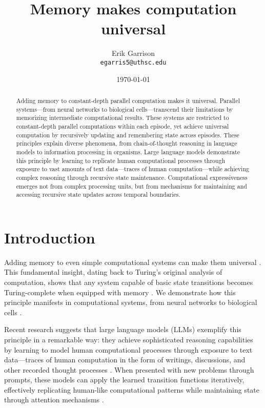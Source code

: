 \documentclass[12pt]{article}
\title{Memory makes computation universal}
\author{Erik Garrison\\
  \texttt{egarris5@uthsc.edu}\\[1ex]
  }
\date{\today}
\begin{document}
\maketitle

\begin{abstract}
Adding memory to constant-depth parallel computation makes it universal.
Parallel systems---from neural networks to biological cells---transcend their limitations by memorizing intermediate computational results.
These systems are restricted to constant-depth parallel computations within each episode, yet achieve universal computation by recursively updating and remembering state across episodes.
These principles explain diverse phenomena, from chain-of-thought reasoning in language models to information processing in organisms.
Large language models demonstrate this principle by learning to replicate human computational processes through exposure to vast amounts of text data---traces of human computation---while achieving complex reasoning through recursive state maintenance.
Computational expressiveness emerges not from complex processing units, but from mechanisms for maintaining and accessing recursive state updates across temporal boundaries.
\end{abstract}

\section{Introduction}
Adding memory to even simple computational systems can make them universal \cite{merrill2023parallelism,peng2024limitations}. This fundamental insight, dating back to Turing's original analysis of computation, shows that any system capable of basic state transitions becomes Turing-complete when equipped with memory \cite{swamy1983space,bisaz2024memory}. We demonstrate how this principle manifests in computational systems, from neural networks to biological cells \cite{wang2023parallel}.

Recent research suggests that large language models (LLMs) exemplify this principle in a remarkable way: they achieve sophisticated reasoning capabilities by learning to model human computational processes through exposure to text data---traces of human computation in the form of writings, discussions, and other recorded thought processes \cite{wei2022chain,brown2020language}. When presented with new problems through prompts, these models can apply the learned transition functions iteratively, effectively replicating human-like computational patterns while maintaining state through attention mechanisms \cite{chowdhery2022palm,wei2022emergent}.
\end{document}
